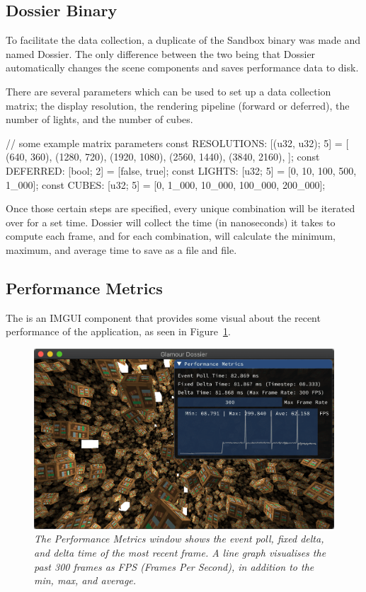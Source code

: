 \subsection{Dossier Binary}
To facilitate the data collection, a duplicate of the Sandbox binary was made and named Dossier.
The only difference between the two being that Dossier automatically changes the scene components and saves performance data to disk.

There are several parameters which can be used to set up a data collection matrix; the display resolution, the rendering pipeline (forward or deferred), the number of lights, and the number of cubes.

  \begin{rustcode}
// some example matrix parameters
const RESOLUTIONS: [(u32, u32); 5] = [
    (640, 360),
    (1280, 720),
    (1920, 1080),
    (2560, 1440),
    (3840, 2160),
];
const DEFERRED: [bool; 2] = [false, true];
const LIGHTS: [u32; 5] = [0, 10, 100, 500, 1_000];
const CUBES: [u32; 5] = [0, 1_000, 10_000, 100_000, 200_000];
  \end{rustcode}

Once those certain steps are specified, every unique combination will be iterated over for a set time.
Dossier will collect the time (in nanoseconds) it takes to compute each frame, and for each combination, will calculate the minimum, maximum, and average time to save as a  file and  file.

\subsection{Performance Metrics}
The  is an IMGUI component that provides some visual about the recent performance of the application, as seen in Figure~\ref{fig:perf-metrics}.

\begin{figure}[h!]
  \begin{center}
    \includegraphics[width=0.6\columnwidth]{../perf-metrics.png}
  \end{center}
  \caption[PerfMetricsLayer]{
    \emph{
      The Performance Metrics window shows the event poll, fixed delta, and delta time of the most recent frame.
      A line graph visualises the past 300 frames as FPS (Frames Per Second), in addition to the min, max, and average.
    }
  }\label{fig:perf-metrics}
\end{figure}

